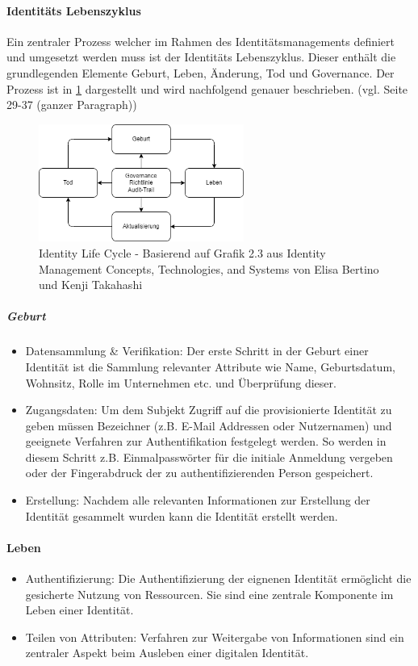 \documentclass[11pt]{article}
\begin{document}
\paragraph{Identitäts Lebenszyklus}
Ein zentraler Prozess welcher im Rahmen des Identitätsmanagements definiert und umgesetzt werden muss ist der Identitäts Lebenszyklus. Dieser enthält die grundlegenden Elemente Geburt, Leben, Änderung, Tod und Governance. Der Prozess ist in \cref{fig:idlc} dargestellt und wird nachfolgend genauer beschrieben. (vgl. \cite{bertino2010identity} Seite 29-37 (ganzer Paragraph))
\begin{figure}[H]
  \centering
  \includegraphics[width=0.6\textwidth]{assets/idlc.png}
  \caption{Identity Life Cycle - Basierend auf Grafik 2.3 aus Identity Management Concepts, Technologies, and Systems von Elisa Bertino und Kenji Takahashi}\label{fig:idlc}
\end{figure}
\subparagraph{Geburt}
\begin{itemize}
  \item Datensammlung \& Verifikation: Der erste Schritt in der Geburt einer Identität ist die Sammlung relevanter Attribute wie Name, Geburtsdatum, Wohnsitz, Rolle im Unternehmen etc. und Überprüfung dieser.
  \item Zugangsdaten: Um dem Subjekt Zugriff auf die provisionierte Identität zu geben müssen Bezeichner (z.B. E-Mail Addressen oder Nutzernamen) und geeignete Verfahren zur Authentifikation festgelegt werden. So werden in diesem Schritt z.B. Einmalpasswörter für die initiale Anmeldung vergeben oder der Fingerabdruck der zu authentifizierenden Person gespeichert.
  \item Erstellung: Nachdem alle relevanten Informationen zur Erstellung der Identität gesammelt wurden kann die Identität erstellt werden.
\end{itemize}
\paragraph{Leben}
\begin{itemize}
  \item Authentifizierung: Die Authentifizierung der eignenen Identität ermöglicht die gesicherte Nutzung von Ressourcen. Sie sind eine zentrale Komponente im Leben einer Identität.
  \item Teilen von Attributen: Verfahren zur Weitergabe von Informationen sind ein zentraler Aspekt beim Ausleben einer digitalen Identität.
\end{itemize}
\end{document}
